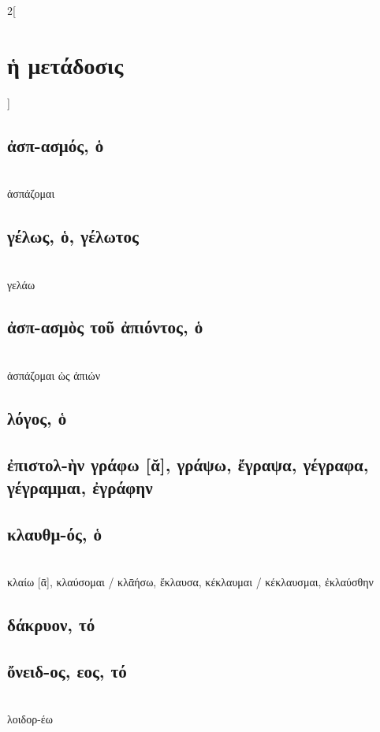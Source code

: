 \documentclass{book}
\begin{document}
\newpage
\begin{multicols}{2}[\section{ἡ μετάδοσις}]
{\renewcommand \thesubsection {\thesection} }
\subsection{ἀσπ-ασμός, ὁ}  ~\\
ἀσπάζομαι 
\subsection{γέλως, ὁ, γέλωτος}  ~\\
γελάω 
\subsection{ἀσπ-ασμὸς τοῦ ἀπιόντος, ὁ}  ~\\
ἀσπάζομαι ὡς ἀπιών 
\subsection{λόγος, ὁ}           
\subsection{ἐπιστολ-ὴν γράφω [ᾰ], γράψω, ἔγραψα, γέγραφα, γέγραμμαι, ἐγράφην}
\subsection{κλαυθμ-ός, ὁ}  ~\\
κλαίω [ᾱ], κλαύσομαι / κλᾱήσω, ἔκλαυσα, κέκλαυμαι / κέκλαυσμαι, ἐκλαύσθην
\subsection{δάκρυον, τό}
\subsection{ὄνειδ-ος, εος, τό}        ~\\
λοιδορ-έω 

\end{multicols}
\end{document}
